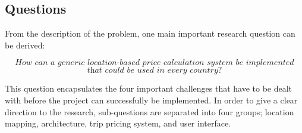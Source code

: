 \subsection{Questions}

From the description of the problem, one main important research question can be derived:

\[\textit{How can a generic location-based price calculation system be implemented}\]
\[\textit{that could be used in every country?}\] \hfill

This question encapsulates the four important challenges that have to be dealt with before the project can successfully be implemented. In order to give a clear direction to the research, sub-questions are separated into four groups; location mapping, architecture, trip pricing system, and user interface.

